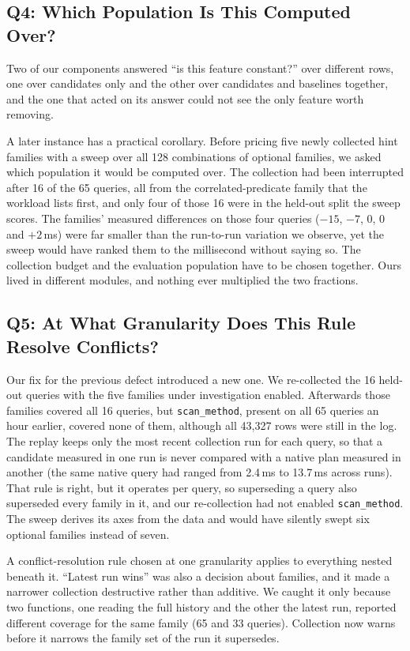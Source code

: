 \documentclass[conference]{IEEEtran}
\begin{document}
\subsection{Q4: Which Population Is This Computed Over?}
\label{sec:q4}

Two of our components answered ``is this feature constant?'' over different
rows, one over candidates only and the other over candidates and baselines
together, and the one that acted on its answer could not see the only feature
worth removing.

A later instance has a practical corollary. Before pricing five newly collected
hint families with a sweep over all 128 combinations of optional families, we
asked which population it would be computed over. The collection had been
interrupted after 16 of the 65 queries, all from the correlated-predicate family
that the workload lists first, and only four of those 16 were in the held-out
split the sweep scores. The families' measured differences on those four
queries ($-15$, $-7$, $0$, $0$ and $+2$\,ms) were far smaller than the
run-to-run variation we observe, yet the sweep would have ranked them to the
millisecond without saying so. The
collection budget and the evaluation population have to be chosen together. Ours
lived in different modules, and nothing ever multiplied the two fractions.

\subsection{Q5: At What Granularity Does This Rule Resolve Conflicts?}
\label{sec:q5}

Our fix for the previous defect introduced a new one. We re-collected the 16
held-out queries with the five families under investigation enabled. Afterwards
those families covered all 16 queries, but \texttt{scan\_method}, present on all
65 queries an hour earlier, covered none of them, although all 43,327 rows were
still in the log. The replay keeps only the most recent collection run for each
query, so that a candidate measured in one run is never compared with a native
plan measured in another (the same native query had ranged from 2.4\,ms to
13.7\,ms across runs). That rule is right, but it operates per query, so
superseding a query also superseded every family in it, and our re-collection
had not enabled \texttt{scan\_method}. The sweep derives its axes from the data
and would have silently swept six optional families instead of seven.

A conflict-resolution rule chosen at one granularity applies to everything
nested beneath it. ``Latest run wins'' was also a decision about families, and it
made a narrower collection destructive rather than additive. We caught it only
because two functions, one reading the full history and the other the latest
run, reported different coverage for the same family (65 and 33 queries).
Collection now warns before it narrows the family set of the run it supersedes.
\end{document}
